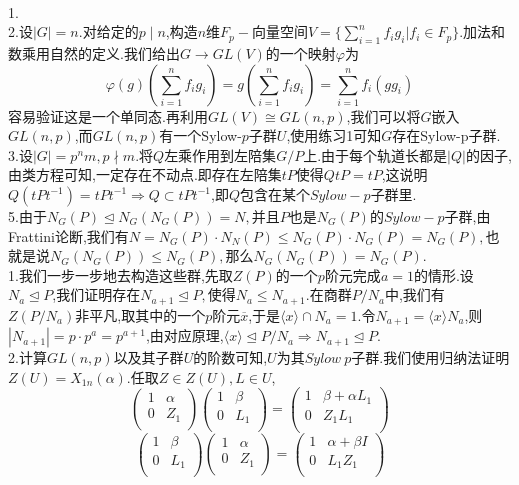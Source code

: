 \documentclass[b5paper,twoside]{ctexart}
\begin{document}
\pagestyle{plain}
\noindent\\
1.\\
2.设$|G|=n$.对给定的$p\mid n$,构造$n$维$F_{p}-$向量空间$V=\{\sum_{i=1}^nf_ig_i|f_i\in F_p\}$.加法和数乘用自然的定义.我们给出$G\to GL(V)$的一个映射$\varphi$为
\[\varphi(g)(\sum_{i=1}^nf_ig_i)=g(\sum_{i=1}^nf_ig_i)=\sum_{i=1}^nf_i(gg_i)\]
容易验证这是一个单同态.再利用$GL(V)\cong GL(n,p)$,我们可以将$G$嵌入$GL(n,p)$,而$GL(n,p)$有一个Sylow-$p$子群$U$,使用练习1可知$G$存在Sylow-p子群.\\
3.设$|G|=p^nm,p\nmid m.$将$Q$左乘作用到左陪集$G/P$上.由于每个轨道长都是$|Q|$的因子,由类方程可知,一定存在不动点.即存在左陪集$tP$使得$QtP=tP$,这说明$Q(tPt^{-1})=tPt^{-1}\Rightarrow Q\subset tPt^{-1}$,即$Q$包含在某个$Sylow-p$子群里.\\
5.由于$N_G(P)\unlhd N_G(N_G(P))=N,$并且$P$也是$N_G(P)$的$Sylow-p$子群,由Frattini论断,我们有$N=N_G(P)\cdot N_N(P)\leq N_G(P)\cdot N_G(P)=N_G(P),$也就是说$N_G(N_G(P))\leq N_G(P),$那么$N_G(N_G(P))= N_G(P).$\\
1.我们一步一步地去构造这些群,先取$Z(P)$的一个$p$阶元完成$a=1$的情形.设$N_a\unlhd P$,我们证明存在$N_{a+1}\unlhd P,$使得$N_a\leq N_{a+1}$.在商群$P/N_a$中,我们有$Z(P/N_a)$非平凡,取其中的一个$p$阶元$\overline{x}$,于是$\langle x\rangle\cap N_a=1$.令$N_{a+1}=\langle x\rangle N_a$,则$|N_{a+1}|=p\cdot p^a=p^{a+1}$,由对应原理,$\langle x\rangle\unlhd P/N_a \Rightarrow N_{a+1}\unlhd P$.\\
2.计算$GL(n,p)$以及其子群$U$的阶数可知,$U$为其$Sylow~p$子群.我们使用归纳法证明$Z(U)=X_{1n}(\alpha)$.任取$Z\in Z(U),L\in U$,
\[\left( \begin{array}{cc}
1 & \alpha\\
0 & Z_1\\
\end{array}\right)\left( \begin{array}{cc}
1 & \beta\\
0 & L_1\\
\end{array}\right)=\left( \begin{array}{cc}
1 & \beta+\alpha L_1\\
0 & Z_1L_1\\
\end{array}\right) \]
\[\left( \begin{array}{cc}
1 & \beta\\
0 & L_1\\
\end{array}\right)\left( \begin{array}{cc}
1 & \alpha\\
0 & Z_1\\
\end{array}\right)=\left( \begin{array}{cc}
1 & \alpha +\beta I\\
0 & L_1Z_1\\
\end{array}\right) \]
\end{document}
